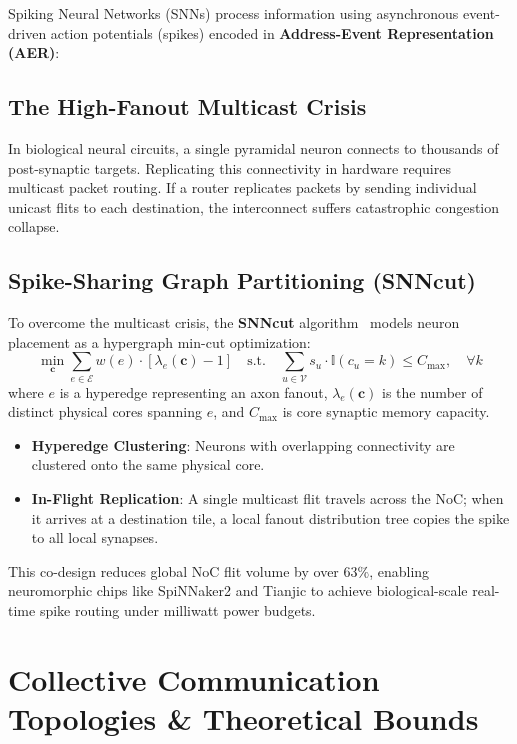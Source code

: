 Spiking Neural Networks (SNNs) process information using asynchronous event-driven action potentials (spikes) encoded in \textbf{Address-Event Representation (AER)}:

\subsection{The High-Fanout Multicast Crisis}
In biological neural circuits, a single pyramidal neuron connects to thousands of post-synaptic targets. Replicating this connectivity in hardware requires multicast packet routing. If a router replicates packets by sending individual unicast flits to each destination, the interconnect suffers catastrophic congestion collapse.

\subsection{Spike-Sharing Graph Partitioning (SNNcut)}
To overcome the multicast crisis, the \textbf{SNNcut} algorithm~\cite{Xing2026SNNcut,Bai2026Sparrow} models neuron placement as a hypergraph min-cut optimization:
\begin{equation}
\min_{\mathbf{c}} \sum_{e \in \mathcal{E}} w(e) \cdot \left[ \lambda_e(\mathbf{c}) - 1 \right] \quad \text{s.t.} \quad \sum_{u \in \mathcal{V}} s_u \cdot \mathbb{I}(c_u = k) \le C_{\max}, \quad \forall k
\end{equation}
where $e$ is a hyperedge representing an axon fanout, $\lambda_e(\mathbf{c})$ is the number of distinct physical cores spanning $e$, and $C_{\max}$ is core synaptic memory capacity.
\begin{itemize}
    \item \textbf{Hyperedge Clustering}: Neurons with overlapping connectivity are clustered onto the same physical core.
    \item \textbf{In-Flight Replication}: A single multicast flit travels across the NoC; when it arrives at a destination tile, a local fanout distribution tree copies the spike to all local synapses.
\end{itemize}
This co-design reduces global NoC flit volume by over $63\%$, enabling neuromorphic chips like SpiNNaker2 and Tianjic to achieve biological-scale real-time spike routing under milliwatt power budgets.

\section{Collective Communication Topologies \& Theoretical Bounds}
\label{sec:collective-bounds}

